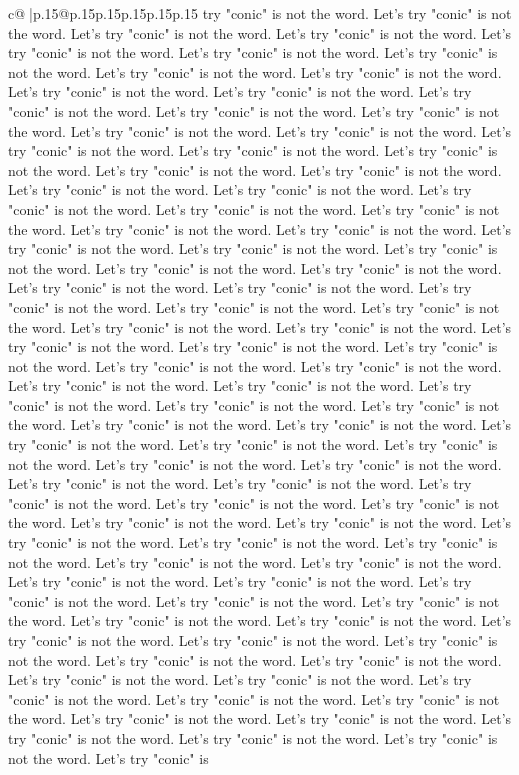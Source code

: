 \documentclass{article}
\begin{document}
{\begin{supertabular}{c@{$\;$}|p{.15\linewidth}@{}p{.15\linewidth}p{.15\linewidth}p{.15\linewidth}p{.15\linewidth}p{.15\linewidth}}
{{{try "conic" is not the word. Let's try "conic" is not the word. Let's try "conic" is not the word. Let's try "conic" is not the word. Let's try "conic" is not the word. Let's try "conic" is not the word. Let's try "conic" is not the word. Let's try "conic" is not the word. Let's try "conic" is not the word. Let's try "conic" is not the word. Let's try "conic" is not the word. Let's try "conic" is not the word. Let's try "conic" is not the word. Let's try "conic" is not the word. Let's try "conic" is not the word. Let's try "conic" is not the word. Let's try "conic" is not the word. Let's try "conic" is not the word. Let's try "conic" is not the word. Let's try "conic" is not the word. Let's try "conic" is not the word. Let's try "conic" is not the word. Let's try "conic" is not the word. Let's try "conic" is not the word. Let's try "conic" is not the word. Let's try "conic" is not the word. Let's try "conic" is not the word. Let's try "conic" is not the word. Let's try "conic" is not the word. Let's try "conic" is not the word. Let's try "conic" is not the word. Let's try "conic" is not the word. Let's try "conic" is not the word. Let's try "conic" is not the word. Let's try "conic" is not the word. Let's try "conic" is not the word. Let's try "conic" is not the word. Let's try "conic" is not the word. Let's try "conic" is not the word. Let's try "conic" is not the word. Let's try "conic" is not the word. Let's try "conic" is not the word. Let's try "conic" is not the word. Let's try "conic" is not the word. Let's try "conic" is not the word. Let's try "conic" is not the word. Let's try "conic" is not the word. Let's try "conic" is not the word. Let's try "conic" is not the word. Let's try "conic" is not the word. Let's try "conic" is not the word. Let's try "conic" is not the word. Let's try "conic" is not the word. Let's try "conic" is not the word. Let's try "conic" is not the word. Let's try "conic" is not the word. Let's try "conic" is not the word. Let's try "conic" is not the word. Let's try "conic" is not the word. Let's try "conic" is not the word. Let's try "conic" is not the word. Let's try "conic" is not the word. Let's try "conic" is not the word. Let's try "conic" is not the word. Let's try "conic" is not the word. Let's try "conic" is not the word. Let's try "conic" is not the word. Let's try "conic" is not the word. Let's try "conic" is not the word. Let's try "conic" is not the word. Let's try "conic" is not the word. Let's try "conic" is not the word. Let's try "conic" is not the word. Let's try "conic" is not the word. Let's try "conic" is not the word. Let's try "conic" is not the word. Let's try "conic" is not the word. Let's try "conic" is not the word. Let's try "conic" is not the word. Let's try "conic" is not the word. Let's try "conic" is not the word. Let's try "conic" is not the word. Let's try "conic" is not the word. Let's try "conic" is not the word. Let's try "conic" is not the word. Let's try "conic" is not the word. Let's try "conic" is not the word. Let's try "conic" is not the word. Let's try "conic" is not the word. Let's try "conic" is not the word. Let's try "conic" is not the word. Let's try "conic" is }}}
\end{supertabular}}
\end{document}
